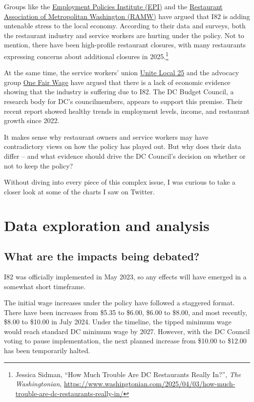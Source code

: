 \documentclass[
  14pt,
]{article}
\begin{document}
Groups like the \href{https://epionline.org/}{Employment Policies
Institute (EPI)} and the \href{https://www.ramw.org/}{Restaurant
Association of Metropolitan Washington (RAMW)} have argued that I82 is
adding untenable stress to the local economy. According to their data
and surveys, both the restaurant industry and service workers are
hurting under the policy. Not to mention, there have been high-profile
restaurant closures, with many restaurants expressing concerns about
additional closures in 2025.\footnote{Jessica Sidman, ``How Much Trouble
  Are DC Restaurants Really In?'', \emph{The Washingtonian},
  \url{https://www.washingtonian.com/2025/04/03/how-much-trouble-are-dc-restaurants-really-in/}}

At the same time, the service workers' union
\href{https://x.com/UHLocal25/status/1929508002828042472}{Unite Local
25} and the advocacy group
\href{https://static1.squarespace.com/static/6374f6bf33b7675afa750d48/t/65551d0897043249c7c1293b/1700076810648/OFW_OneYearAfter_DC82+\%281\%29.pdf}{One
Fair Wage} have argued that there is a lack of economic evidence showing
that the industry is suffering due to I82. The DC Budget Council, a
research body for DC's councilmembers, appears to support this premise.
Their recent report showed healthy trends in employment levels, income,
and restaurant growth since 2022.

It makes sense why restaurant owners and service workers may have
contradictory views on how the policy has played out. But why does their
data differ -- and what evidence should drive the DC Council's decision
on whether or not to keep the policy?

Without diving into every piece of this complex issue, I was curious to
take a closer look at some of the charts I saw on Twitter.

\section{Data exploration and
analysis}\label{data-exploration-and-analysis}

\subsection{What are the impacts being
debated?}\label{what-are-the-impacts-being-debated}

I82 was officially implemented in May 2023, so any effects will have
emerged in a somewhat short timeframe.

The initial wage increases under the policy have followed a staggered
format. There have been increases from \$5.35 to \$6.00, \$6.00 to
\$8.00, and most recently, \$8.00 to \$10.00 in July 2024. Under the
timeline, the tipped minimum wage would reach standard DC minimum wage
by 2027. However, with the DC Council voting to pause implementation,
the next planned increase from \$10.00 to \$12.00 has been temporarily
halted.
\end{document}

